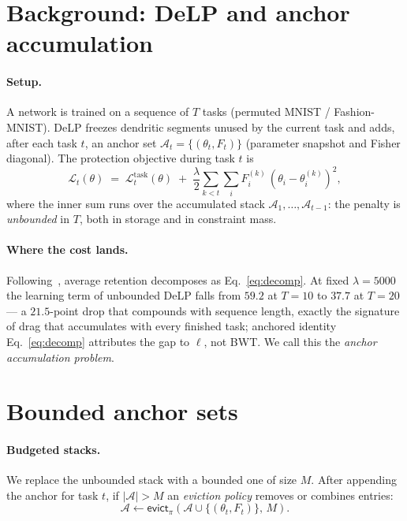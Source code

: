 \documentclass[review,12pt,number]{elsarticle}
\newcommand{\delp}{DeLP}
\begin{document}
\section{Background: \delp{} and anchor accumulation}
\label{sec:background}

\paragraph{Setup.}
A network is trained on a sequence of $T$ tasks (permuted MNIST /
Fashion-MNIST). \delp{} freezes dendritic segments unused by the
current task and adds, after each task $t$, an anchor set
$\mathcal{A}_t = \{(\theta_t, F_t)\}$ (parameter snapshot and Fisher
diagonal). The protection objective during task $t$ is
%
\begin{equation}
\label{eq:delp}
\mathcal{L}_t(\theta) \;=\; \mathcal{L}_t^{\text{task}}(\theta)
\;+\; \frac{\lambda}{2}\sum_{k<t}\sum_i F^{(k)}_i
      \,(\theta_i - \theta^{(k)}_i)^2 ,
\end{equation}
%
where the inner sum runs over the accumulated stack
$\mathcal{A}_1, \dots, \mathcal{A}_{t-1}$: the penalty is
\emph{unbounded} in $T$, both in storage and in constraint mass.

\paragraph{Where the cost lands.}
Following~\cite{zhou2026delp}, average retention decomposes as
Eq.~\ref{eq:decomp}. %
At fixed $\lambda{=}5000$ the learning term of unbounded \delp{}
falls from $59.2$ at $T{=}10$ to $37.7$ at $T{=}20$ --- a
$21.5$-point drop that compounds with sequence length, exactly the
signature of drag that accumulates with every finished task;
anchored identity Eq.~\ref{eq:decomp} attributes the gap to $\ell$,
not BWT. We call this the \emph{anchor accumulation problem}.

\section{Bounded anchor sets}
\label{sec:method}

\paragraph{Budgeted stacks.}
We replace the unbounded stack with a bounded one of size $M$.
After appending the anchor for task $t$, if $|\mathcal{A}| > M$ an
\emph{eviction policy} removes or combines entries:
%
\begin{equation}
\label{eq:budget}
\mathcal{A} \leftarrow \mathsf{evict}_\pi\!\left(
\mathcal{A} \cup \{(\theta_t, F_t)\},\, M \right).
\end{equation}
\end{document}
